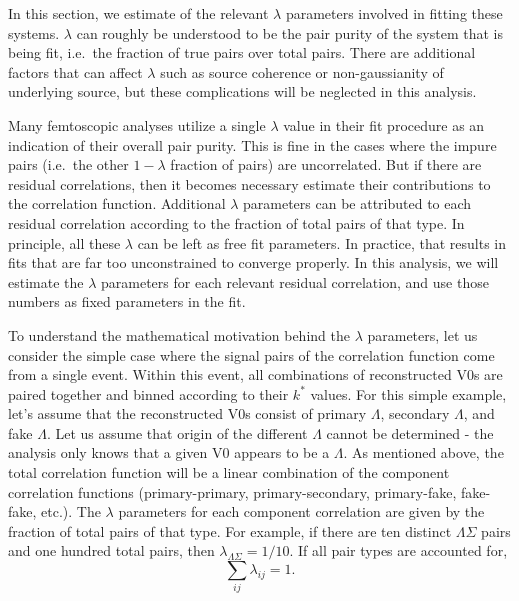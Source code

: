 In this section, we estimate of the relevant $\lambda$ parameters involved in fitting these systems.  
$\lambda$ can roughly be understood to be the pair purity of the system that is being fit, i.e.\ the fraction of true pairs over total pairs.  
There are additional factors that can affect $\lambda$ such as source coherence or non-gaussianity of underlying source, but these complications will be neglected in this analysis.

Many femtoscopic analyses utilize a single $\lambda$ value in their fit procedure as an indication of their overall pair purity.  
This is fine in the cases where the impure pairs (i.e.\ the other $1 - \lambda$ fraction of pairs) are uncorrelated.
But if there are residual correlations, then it becomes necessary estimate their contributions to the correlation function.
Additional $\lambda$ parameters can be attributed to each residual correlation according to the fraction of total pairs of that type.
In principle, all these $\lambda$ can be left as free fit parameters.
In practice, that results in fits that are far too unconstrained to converge properly.
In this analysis, we will estimate the $\lambda$ parameters for each relevant residual correlation, and use those numbers as fixed parameters in the fit.


To understand the mathematical motivation behind the $\lambda$ parameters, let us consider the simple case where the signal pairs of the correlation function come from a single event.  
Within this event, all combinations of reconstructed V0s are paired together and binned according to their $k^*$ values.  
For this simple example, let's assume that the reconstructed V0s consist of primary $\Lambda$, secondary $\Lambda$, and fake $\Lambda$.  
Let us assume that origin of the different $\Lambda$ cannot be determined - the analysis only knows that a given V0 appears to be a $\Lambda$.  
As mentioned above, the total correlation function will be a linear combination of the component correlation functions (primary-primary, primary-secondary, primary-fake, fake-fake, etc.).  
The $\lambda$ parameters for each component correlation are given by the fraction of total pairs of that type.  
For example, if there are ten distinct $\Lambda\Sigma$ pairs and one hundred total pairs, then $\lambda_{\Lambda\Sigma} = 1/10$.  
If all pair types are accounted for, 
\begin{equation}
\label{eq:SumLambdaUnity}
\sum\limits_{ij}\lambda_{ij} = 1.
\end{equation}


